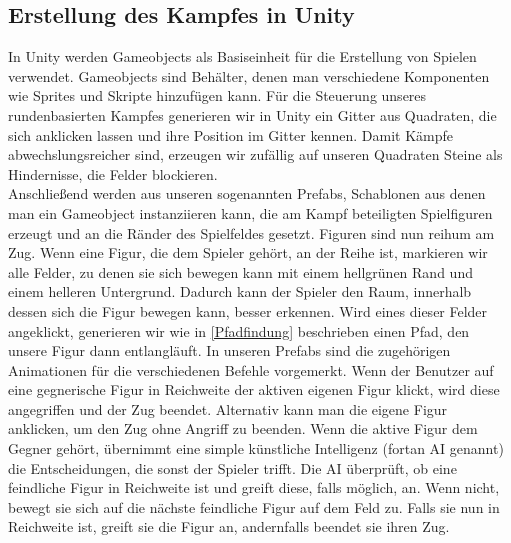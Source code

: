\documentclass[extern,palatino]{cgBA}
\begin{document}
\subsection{Erstellung des Kampfes in Unity}\label{kampf}
In Unity werden Gameobjects als Basiseinheit für die Erstellung von Spielen verwendet. Gameobjects sind Behälter, denen man verschiedene Komponenten wie Sprites und Skripte hinzufügen kann. %
Für die Steuerung unseres rundenbasierten Kampfes generieren wir in Unity ein Gitter aus Quadraten, die sich anklicken lassen und ihre Position im Gitter kennen. Damit Kämpfe abwechslungsreicher sind, erzeugen wir zufällig auf unseren Quadraten Steine als Hindernisse, die Felder blockieren.\\ Anschließend werden aus unseren sogenannten Prefabs, Schablonen aus denen man ein Gameobject instanziieren kann, die am Kampf beteiligten Spielfiguren erzeugt und an die Ränder des Spielfeldes gesetzt. Figuren sind nun reihum am Zug. Wenn eine Figur, die dem Spieler gehört, an der Reihe ist, markieren wir alle Felder, zu denen sie sich bewegen kann mit einem hellgrünen Rand und einem helleren Untergrund. Dadurch kann der Spieler den Raum, innerhalb dessen sich die Figur bewegen kann, besser erkennen. Wird eines dieser Felder angeklickt, generieren wir wie in \ref{Pfadfindung} beschrieben einen Pfad, den unsere Figur dann entlangläuft. In unseren Prefabs sind die zugehörigen Animationen für die verschiedenen Befehle vorgemerkt. Wenn der Benutzer auf eine gegnerische Figur in Reichweite der aktiven eigenen Figur klickt, wird diese angegriffen und der Zug beendet. Alternativ kann man die eigene Figur anklicken, um den Zug ohne Angriff zu beenden. Wenn die aktive Figur dem Gegner gehört, übernimmt eine simple künstliche Intelligenz (fortan AI genannt) die Entscheidungen, die sonst der Spieler trifft. Die AI überprüft, ob eine feindliche Figur in Reichweite ist und greift diese, falls möglich, an. Wenn nicht, bewegt sie sich auf die nächste feindliche Figur auf dem Feld zu. Falls sie nun in Reichweite ist, greift sie die Figur an, andernfalls beendet sie ihren Zug.
\end{document}
